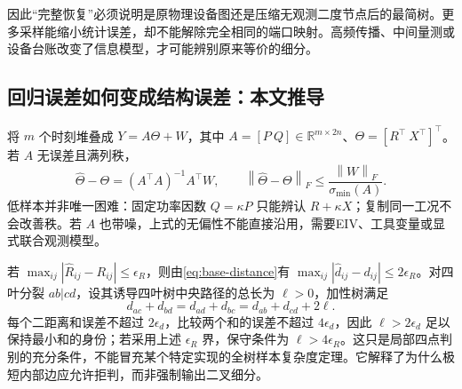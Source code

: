 \documentclass[UTF8,11pt,fontset=fandol]{ctexart}
\newcommand{\R}{\mathbb{R}}
\newcommand{\norm}[1]{\left\lVert#1\right\rVert}
\theoremstyle{remark}
\numberwithin{equation}{section}
\begin{document}
\begin{center}
\end{center}

因此“完整恢复”必须说明是原物理设备图还是压缩无观测二度节点后的最简树。更多采样能缩小统计误差，却不能解除完全相同的端口映射。高频传播、中间量测或设备台账改变了信息模型，才可能辨别原来等价的细分。

\subsection{回归误差如何变成结构误差：本文推导}
将 $m$ 个时刻堆叠成 $Y=A\Theta+W$，其中 $A=[P\ Q]\in\R^{m\times2n}$、$\Theta=[R^\top\ X^\top]^\top$。若 $A$ 无误差且满列秩，
\begin{equation}
 \widehat\Theta-\Theta=(A^\top A)^{-1}A^\top W,
 \qquad \norm{\widehat\Theta-\Theta}_F\leq\frac{\norm W_F}{\sigma_{\min}(A)}.
\end{equation}
低样本并非唯一困难：固定功率因数 $Q=\kappa P$ 只能辨认 $R+\kappa X$；复制同一工况不会改善秩。若 $A$ 也带噪，上式的无偏性不能直接沿用，需要EIV、工具变量或显式联合观测模型。

若 $\max_{ij}|\widehat R_{ij}-R_{ij}|\leq\epsilon_R$，则由\eqref{eq:base-distance}有 $\max_{ij}|\widehat d_{ij}-d_{ij}|\leq2\epsilon_R$。对四叶分裂 $ab|cd$，设其诱导四叶树中央路径的总长为 $\ell>0$，加性树满足
\begin{equation}
 d_{ac}+d_{bd}=d_{ad}+d_{bc}=d_{ab}+d_{cd}+2\ell.
\end{equation}
每个二距离和误差不超过 $2\epsilon_d$，比较两个和的误差不超过 $4\epsilon_d$，因此 $\ell>2\epsilon_d$ 足以保持最小和的身份；若采用上述 $\epsilon_R$ 界，保守条件为 $\ell>4\epsilon_R$。这只是局部四点判别的充分条件，不能冒充某个特定实现的全树样本复杂度定理。它解释了为什么极短内部边应允许拒判，而非强制输出二叉细分。
\end{document}

